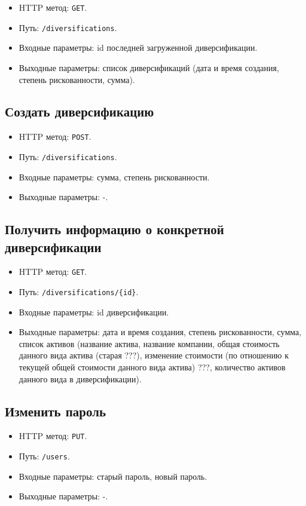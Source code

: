 \documentclass[a4paper, 14pt]{article}
\begin{document}
\begin{itemize}
    \item HTTP метод: \texttt{GET}.
    \item Путь: \texttt{/diversifications}.
    \item Входные параметры: id последней загруженной диверсификации.
    \item Выходные параметры: список диверсификаций (дата и время создания, степень рискованности, сумма).
\end{itemize}

\subsection{Создать диверсификацию}

\begin{itemize}
    \item HTTP метод: \texttt{POST}.
    \item Путь: \texttt{/diversifications}.
    \item Входные параметры: сумма, степень рискованности.
    \item Выходные параметры: -.
\end{itemize}

\subsection{Получить информацию о конкретной диверсификации}

\begin{itemize}
    \item HTTP метод: \texttt{GET}.
    \item Путь: \texttt{/diversifications/\{id\}}.
    \item Входные параметры: id диверсификации.
    \item Выходные параметры: дата и время создания, степень рискованности, сумма, список активов (название актива, название компании, общая стоимость данного вида актива (старая ???), изменение стоимости (по отношению к текущей общей стоимости данного вида актива) ???, количество активов данного вида в диверсификации).
\end{itemize}

\subsection{Изменить пароль}

\begin{itemize}
    \item HTTP метод: \texttt{PUT}.
    \item Путь: \texttt{/users}.
    \item Входные параметры: старый пароль, новый пароль.
    \item Выходные параметры: -.
\end{itemize}
\end{document}
